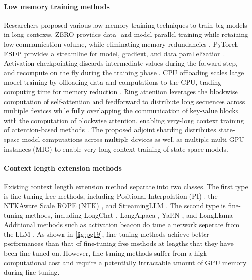 \documentclass{article}
\begin{document}
\paragraph{Low memory training methods}
Researchers proposed various low memory training techniques to train big models in long contexts. ZERO provides data- and model-parallel training while retaining low communication volume, while eliminating memory redundancies \citep{rajbhandari2020zeromemoryoptimizationstraining}. PyTorch FSDP provides a streamline for model, gradient, and data parallelization \citep{zhao2023pytorchfsdpexperiencesscaling}. Activation checkpointing discards intermediate values during the forward step, and recompute on the fly during the training phase \citep{sohoni2022lowmemoryneuralnetworktraining}. CPU offloading scales large model training by offloading data and computations to the CPU, trading computing time for memory reduction \citep{ren2021zerooffloaddemocratizingbillionscalemodel}. Ring attention leverages the blockwise computation of self-attention and feedforward to distribute long sequences across multiple devices while fully overlapping the communication of key-value blocks with the computation of blockwise attention, enabling very-long context training of attention-based methods \citep{liu2023ringattentionblockwisetransformers, liu2024worldmodelmillionlengthvideo}. The proposed adjoint sharding distributes state-space model computations across multiple devices as well as multiple multi-GPU-instances (MIG) to enable very-long context training of state-space models.

\paragraph{Context length extension methods}
Existing context length extension method separate into two classes. The first type is fine-tuning free methods, including Positional Interpolation (PI) \citep{chen2023extendingcontextwindowlarge}, the NTKAware Scale ROPE (NTK) \citep{ntkReddit2023}, and StreamingLLM \citep{xiao2024efficientstreaminglanguagemodels}. The second type is fine-tuning methods, including LongChat \citep{longchat2023}, LongAlpaca \citep{chen2024longloraefficientfinetuninglongcontext}, YaRN \citep{peng2023yarnefficientcontextwindow}, and LongLlama \citep{chen2024longloraefficientfinetuninglongcontext}. Additional methods such as activation beacon do tune a network seperate from the LLM \citep{zhang2024soaring4k400kextending}. As shown in \autoref{fig:pg19}, fine-tuning methods achieve better performances than that of fine-tuning free methods at lengths that they have been fine-tuned on. However, fine-tuning methods suffer from a high computational cost and require a potentially intractable amount of GPU memory during fine-tuning.
\end{document}
